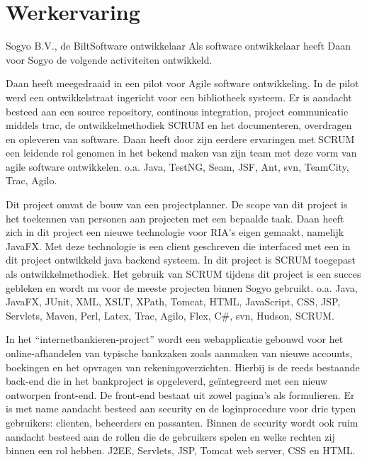 \section*{Werkervaring}

	\begin{workExperience}{Sogyo B.V., de Bilt}{Software ontwikkelaar}{}
		Als software ontwikkelaar heeft Daan voor Sogyo de volgende 
		activiteiten ontwikkeld.
		
		Daan heeft meegedraaid in een pilot voor Agile software ontwikkeling. In
		de pilot werd een ontwikkelstraat ingericht voor een bibliotheek 
		systeem. Er is aandacht besteed aan	een source repository, continous 
		integration, project communicatie middels trac, de ontwikkelmethodiek 
		SCRUM en het documenteren, overdragen en opleveren van software.
		Daan heeft door zijn eerdere ervaringen met SCRUM een leidende rol
		genomen in het bekend maken van zijn team met deze vorm van agile 
		software ontwikkelen.
		\technics o.a. Java, TestNG, Seam, JSF, Ant, svn, TeamCity, Trac, Agilo.
		
		Dit project omvat de bouw van een projectplanner. De scope van dit 
		project is het toekennen van personen aan projecten met een bepaalde 
		taak. Daan heeft zich in dit project een nieuwe technologie voor RIA's 
		eigen gemaakt, namelijk JavaFX. Met deze technologie is een client 
		geschreven die interfaced met een in dit project ontwikkeld java backend
		systeem. In dit project is SCRUM toegepast als ontwikkelmethodiek. Het 
		gebruik van SCRUM tijdens dit project is een succes gebleken en wordt nu
		voor de meeste projecten binnen Sogyo gebruikt.
		\technics o.a. Java, JavaFX, JUnit, XML, XSLT, XPath, Tomcat, HTML, 
		JavaScript, CSS, JSP, Servlets, Maven, Perl, Latex, Trac, Agilo, Flex, 
		C\#, svn, Hudson, SCRUM.

		In het ``internetbankieren-project'' wordt een webapplicatie gebouwd voor
		het online-afhandelen van typische bankzaken zoals aanmaken van nieuwe 
		accounts, boekingen en het opvragen van rekeningoverzichten. Hierbij is
		de reeds bestaande back-end die in het bankproject is opgeleverd, 
		geïntegreerd met een nieuw ontworpen front-end. De front-end bestaat uit
		zowel pagina’s als formulieren. Er is met name aandacht besteed aan
		security en de loginprocedure voor drie typen gebruikers: clienten, 
		beheerders en passanten. Binnen de security wordt ook ruim aandacht 
		besteed aan de rollen die de gebruikers spelen en welke rechten zij
		binnen een rol hebben.
		\technics J2EE, Servlets, JSP, Tomcat web server, CSS en HTML. 
		

\end{workExperience}
